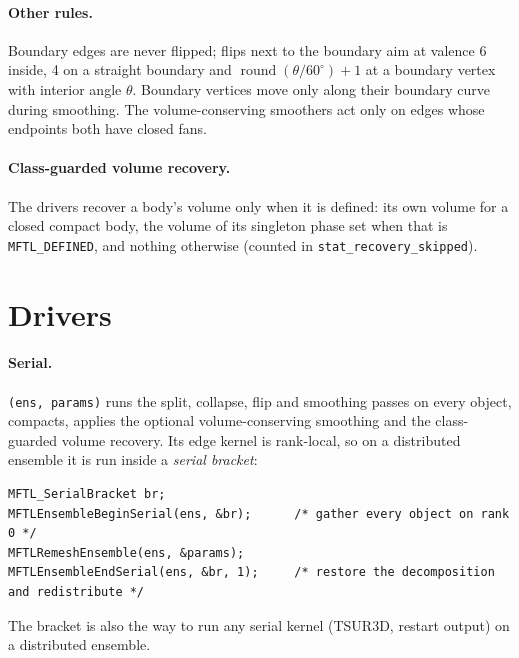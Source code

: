 \paragraph{Other rules.} Boundary edges are never flipped; flips next to the boundary aim at
valence 6 inside, 4 on a straight boundary and $\operatorname{round}(\theta/60^\circ)+1$ at a
boundary vertex with interior angle $\theta$. Boundary vertices move only along their boundary
curve during smoothing. The volume-conserving smoothers act only on edges whose endpoints both
have closed fans.

\paragraph{Class-guarded volume recovery.} The drivers recover a body's volume only when it is
defined: its own volume for a closed compact body, the volume of its singleton phase set when
that is \texttt{MFTL\_DEFINED}, and nothing otherwise (counted in
\texttt{stat\_recovery\_skipped}).

\section{Drivers}
\label{sec:serial-bracket}

\paragraph{Serial.} \texttt{(ens, params)} runs the split, collapse, flip and
smoothing passes on every object, compacts, applies the optional volume-conserving smoothing and
the class-guarded volume recovery. Its edge kernel is rank-local, so on a distributed ensemble it
is run inside a \emph{serial bracket}:
\begin{lstlisting}[numbers=none]
MFTL_SerialBracket br;
MFTLEnsembleBeginSerial(ens, &br);      /* gather every object on rank 0 */
MFTLRemeshEnsemble(ens, &params);
MFTLEnsembleEndSerial(ens, &br, 1);     /* restore the decomposition and redistribute */
\end{lstlisting}
The bracket is also the way to run any serial kernel (TSUR3D, restart output) on a distributed
ensemble.

